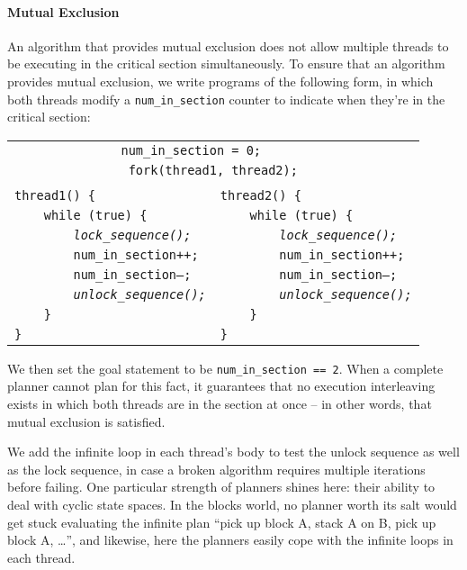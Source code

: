 \paragraph{Mutual Exclusion}
An algorithm that provides mutual exclusion does not allow multiple threads to be executing in the critical section simultaneously. To ensure that an algorithm provides mutual exclusion, we write programs of the following form, in which both threads modify a \texttt{num\_in\_section} counter to indicate when they're in the critical section:
%
\begin{center} \small
\begin{tabular}{ll}
\multicolumn{2}{c}{\texttt{num\_in\_section = 0;~~~~~~}} \\
\multicolumn{2}{c}{\texttt{fork(thread1, thread2);}} \\
& \\
\texttt{thread1() \{} & \texttt{thread2() \{} \\
\texttt{~~~~while (true) \{} & \texttt{~~~~while (true) \{} \\
\texttt{~~~~~~~~\em lock\_sequence();} & \texttt{~~~~~~~~\em lock\_sequence();} \\
\texttt{~~~~~~~~num\_in\_section++;} & \texttt{~~~~~~~~num\_in\_section++;} \\
\texttt{~~~~~~~~num\_in\_section--;} & \texttt{~~~~~~~~num\_in\_section--;} \\
\texttt{~~~~~~~~\em unlock\_sequence();\qquad} & \texttt{~~~~~~~~\em unlock\_sequence();} \\
\texttt{~~~~\}} & \texttt{~~~~\}} \\
\texttt{\}} & \texttt{\}} \\
\end{tabular}
\end{center}
%
We then set the goal statement to be \texttt{num\_in\_section == 2}. When a complete planner cannot plan for this fact, it guarantees that no execution interleaving exists in which both threads are in the section at once -- in other words, that mutual exclusion is satisfied.

We add the infinite loop in each thread's body to test the unlock sequence as well as the lock sequence, in case a broken algorithm requires multiple iterations before failing. One particular strength of planners shines here: their ability to deal with cyclic state spaces. In the blocks world, no planner worth its salt would get stuck evaluating the infinite plan ``pick up block A, stack A on B, pick up block A, \dots'', and likewise, here the planners easily cope with the infinite loops in each thread.

